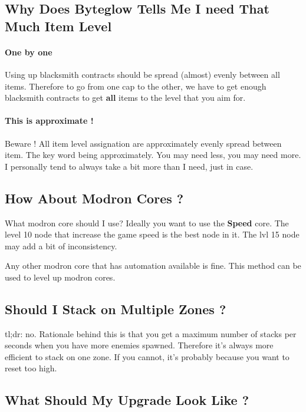 \documentclass{article}
\begin{document}
\subsection{Why Does Byteglow Tells Me I need That Much Item Level}

\paragraph{One by one}

Using up blacksmith contracts should be spread (almost) evenly between all items.
Therefore to go from one cap to the other, we have to get enough blacksmith contracts to get \textbf{all} items to the level that you aim for.

\paragraph{This is approximate !}
Beware !
All item level assignation are approximately evenly spread between item.
The key word being approximately.
You may need less, you may need more.
I personally tend to always take a bit more than I need, just in case.

\subsection{How About Modron Cores ?}

What modron core should I use?
Ideally you want to use the \textbf{Speed} core.
The level 10 node that increase the game speed is the best node in it.
The lvl 15 node may add a bit of inconsistency.

Any other modron core that has automation available is fine.
This method can be used to level up modron cores.


\subsection{Should I Stack on Multiple Zones ?}

tl;dr: no.\newline
Rationale behind this is that you get a maximum number of stacks per seconds when you have more enemies spawned.
Therefore it's always more efficient to stack on one zone.
If you cannot, it's probably because you want to reset too high.



\subsection{What Should My Upgrade Look Like ?}
\end{document}
